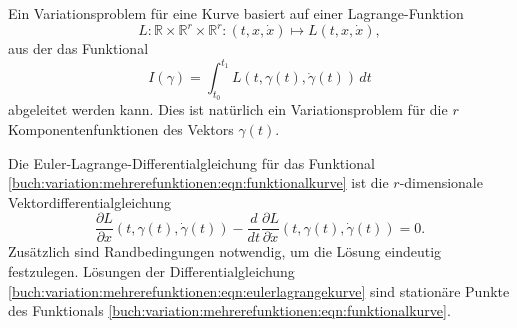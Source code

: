 Ein Variationsproblem für eine Kurve basiert auf einer Lagrange-Funktion
\[
L
\colon
\mathbb{R}\times\mathbb{R}^r\times\mathbb{R}^r
:
(t,x,\dot{x})
\mapsto
L(t,x,\dot{x}),
\]
aus der das Funktional
\begin{equation}
I(\gamma)
=
\int_{t_0}^{t_1}
L(t,\gamma(t),\dot{\gamma}(t))
\,dt
\label{buch:variation:mehrerefunktionen:eqn:funktionalkurve}
\end{equation}
abgeleitet werden kann.
Dies ist natürlich ein Variationsproblem für die $r$ Komponentenfunktionen
des Vektors $\gamma(t)$.

Die Euler-Lagrange-Differentialgleichung für das Funktional
\eqref{buch:variation:mehrerefunktionen:eqn:funktionalkurve}
ist die $r$-di\-men\-sio\-na\-le Vektordifferentialgleichung
\begin{equation}
\frac{\partial L}{\partial x}(t,\gamma(t), \dot{\gamma}(t))
-
\frac{d}{dt}
\frac{\partial L}{\partial \dot{x}}(t,\gamma(t),\dot{\gamma}(t))
=
0.
\label{buch:variation:mehrerefunktionen:eqn:eulerlagrangekurve}
\end{equation}
Zusätzlich sind Randbedingungen notwendig, um die Lösung 
eindeutig festzulegen.
Lösungen der Differentialgleichung
\eqref{buch:variation:mehrerefunktionen:eqn:eulerlagrangekurve}
sind stationäre Punkte des Funktionals
\eqref{buch:variation:mehrerefunktionen:eqn:funktionalkurve}.

%
%






